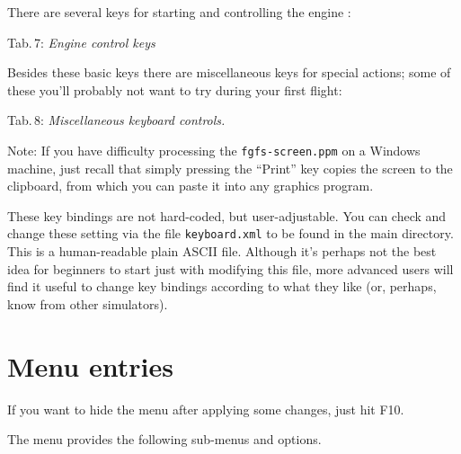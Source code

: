 \centerline{}
\medskip

There are several keys for starting and controlling the engine :

\noindent
 Tab.\,7: \textit{Engine control keys}
\medskip

\centerline{}
\medskip

Besides these basic keys there are miscellaneous keys for special
actions; some of these you'll probably not want to try during your
first flight:
\vfill
\eject

\noindent Tab.\,8: \textit{Miscellaneous keyboard controls.}
\medskip

\centerline{}
\medskip

\noindent
 Note: If you have difficulty processing the 
\texttt{fgfs-screen.ppm}
on a Windows machine, just recall that simply pressing the ``Print'' key copies
the
screen to the clipboard, from which you can paste it into any graphics program.

These key bindings are not hard-coded, but
user-adjustable.
You can check and change these setting via the file
\texttt{keyboard.xml} to be found in the main
\FlightGear{} directory. This is a human-readable plain ASCII file.
Although it's perhaps not the best idea for beginners to start just
with modifying this file, more advanced users will find it useful to
change key bindings according to what they like (or, perhaps, know from
other simulators).

\section{Menu entries}

If you want to hide the menu after applying some changes, just hit F10.

The menu provides the following sub-menus and options.

